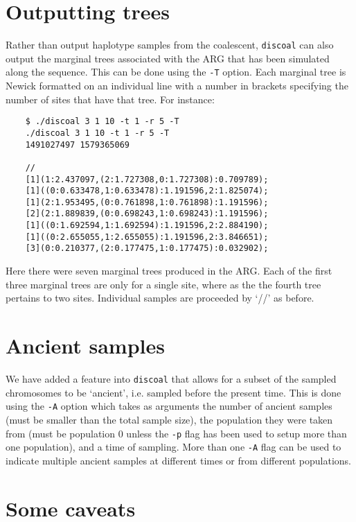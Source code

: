 \documentclass[12pt]{article}
\begin{document}
\section*{Outputting trees}
Rather than output haplotype samples from the coalescent, \texttt{discoal} can also output the marginal trees associated with the ARG that has been simulated along the sequence. This can be done using the \texttt{-T} option. Each marginal tree is Newick formatted on an individual line with a number in brackets specifying the number of sites that have that tree. For instance:
\begin{verbatim}
	$ ./discoal 3 1 10 -t 1 -r 5 -T
	./discoal 3 1 10 -t 1 -r 5 -T
	1491027497 1579365069

	//
	[1](1:2.437097,(2:1.727308,0:1.727308):0.709789);
	[1]((0:0.633478,1:0.633478):1.191596,2:1.825074);
	[1](2:1.953495,(0:0.761898,1:0.761898):1.191596);
	[2](2:1.889839,(0:0.698243,1:0.698243):1.191596);
	[1]((0:1.692594,1:1.692594):1.191596,2:2.884190);
	[1]((0:2.655055,1:2.655055):1.191596,2:3.846651);
	[3](0:0.210377,(2:0.177475,1:0.177475):0.032902);
\end{verbatim}
Here there were seven marginal trees produced in the ARG. Each of the first three marginal trees are only for a single site, where as the the fourth tree pertains to two sites. Individual samples are proceeded by `//' as before.

\section*{Ancient samples}
We have added a feature into \texttt{discoal} that allows for a subset of the sampled chromosomes to be `ancient', i.e. sampled before the present time. This is done using the \texttt{-A} option which takes as arguments the number of ancient samples (must be smaller than the total sample size), the population they were taken from (must be population 0 unless the \texttt{-p} flag has been used to setup more than one population), and a time of sampling. More than one \texttt{-A} flag can be used to indicate multiple ancient samples at different times or from different populations. 

\section*{Some caveats}
\end{document}
